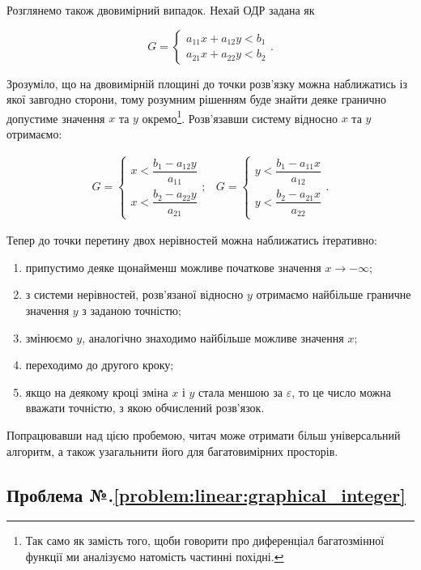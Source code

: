 \documentclass[\main/book.tex]{subfiles}
\begin{document}
Розглянемо також двовимірний випадок. Нехай ОДР задана як

\[
 G = \left\{
  \begin{array}{l}
   a_{11} x + a_{12} y < b_1 \\
   a_{21} x + a_{22} y < b_2
  \end{array}
 \right..
\]

Зрозуміло, що на двовимірній площині до точки розв'язку можна наближатись із якої завгодно сторони, тому розумним рішенням буде знайти деяке гранично допустиме значення $x$ та $y$ окремо\footnote{Так само як замість того, щоби говорити про диференціал багатозмінної функції ми аналізуємо натомість частинні похідні.}. Розв'язавши систему відносно $x$ та $y$ отримаємо:

\[
 \begin{array}{ll}
 G = \left\{
  \begin{array}{l}
   x < \dfrac{b_1 - a_{12} y}{a_{11}} \\ [8pt]
   x < \dfrac{b_2 - a_{22} y}{a_{21}}
  \end{array}
 \right.;
 &
 G = \left\{
  \begin{array}{l}
   y < \dfrac{b_1 - a_{11} x}{a_{12}} \\ [8pt]
   y < \dfrac{b_2 - a_{21} x}{a_{22}}
  \end{array}
 \right..
 \end{array}
\]

Тепер до точки перетину двох нерівностей можна наближатись ітеративно:

\begin{enumerate}
 \item припустимо деяке щонайменш можливе початкове значення ${x \to -\infty}$;
 \item з системи нерівностей, розв'язаної відносно $y$ отримаємо найбільше граничне значення $y$ з заданою точністю;
 \item змінюємо $y$, аналогічно знаходимо найбільше можливе значення $x$;
 \item переходимо до другого кроку;
 \item якщо на деякому кроці зміна $x$ і $y$ стала меншою за $\varepsilon$, то це число можна вважати точністю, з якою обчислений розв'язок.
\end{enumerate}

Попрацювавши над цією пробемою, читач може отримати більш універсальний алгоритм, а також узагальнити його для багатовимірних просторів.

\subsection*{Проблема №.\ref{problem:linear:graphical_integer}}
\end{document}

